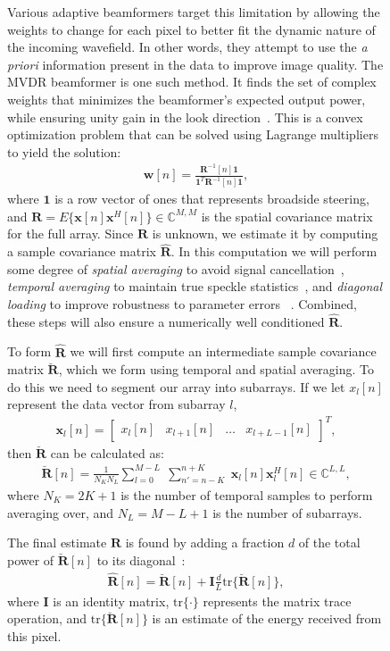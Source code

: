 \documentclass[12pt,journal,draftclsnofoot,onecolumn]{IEEEtran}
\newcommand\bmat[1]{\begin{bmatrix}#1\end{bmatrix}}
\newcommand\tr{\text{tr}}
\newcommand\sumb[2]{\sum\limits_{#1}^{#2}\;}
\newcommand\T{^{\scriptscriptstyle T}}
\renewcommand\H{^{\scriptscriptstyle H}}
\renewcommand\vec[1]{\boldsymbol{#1}}
\newcommand\mat[1]{\boldsymbol{#1}}
\newcommand\1{\vec 1}
\newcommand\I{\mat I}
\newcommand*\x{\vec x}
\newcommand*\R{\mat R}
\newcommand*\Ri{\R^{-1}}
\newcommand*\eR{\mat{\hat R}}
\begin{document}
\begin{figure}[H]
Various adaptive beamformers target this limitation by allowing the weights to change for each pixel to better fit the dynamic nature of the incoming wavefield. In other words, they attempt to use the \emph{a priori} information present in the data to improve image quality. The MVDR beamformer is one such method. It finds the set of complex weights that minimizes the beamformer's expected output power, while ensuring unity gain in the look direction~\cite{Capon1969}. This is a convex optimization problem that can be solved using Lagrange multipliers to yield the solution:
\begin{gather}
\vec w[n] = \frac{\Ri[n]\1}{\1\T\Ri[n]\1},\label{weights}
\end{gather}
where $\1$ is a row vector of ones that represents broadside steering, and $\R=E\{\x[n]\x\H[n]\} \in\mathbb{C}^{M,M}$ is the spatial covariance matrix for the full array. Since $\R$ is unknown, we estimate it by computing a sample covariance matrix $\eR$. In this computation we will perform some degree of \emph{spatial averaging} to avoid signal cancellation~\cite{Kailath1985}, \emph{temporal averaging} to maintain true speckle statistics~\cite{Synnevag2009a}, and \emph{diagonal loading} to improve robustness to parameter errors ~\cite{Cox1987,Maksym1979}. Combined, these steps will also ensure a numerically well conditioned $\eR$.

To form $\eR$ we will first compute an intermediate sample covariance matrix $\breve{\R}$, which we form using temporal and spatial averaging. To do this we need to segment our array into subarrays. If we let $x_l[n]$ represent the data vector from subarray $l$,
\begin{gather}
\x_l[n] = \bmat{x_l[n] & x_{l+1}[n] & \dots & x_{l+L-1}[n]}\T,
\end{gather}
then $\breve{\R}$ can be calculated as:
\begin{gather}
\breve{\R}[n] =  \frac{1}{N_K N_L} \sumb{l=0}{M-L}\sumb{n'=n-K}{n+K} \x_l[n]\x_l\H[n] \in\mathbb{C}^{L,L},\label{spatialR}
\end{gather}
where $N_K = 2K+1$ is the number of temporal samples to perform averaging over, and $N_L = M-L+1$ is the number of subarrays.

The final estimate $\eR$ is found by adding a fraction $d$ of the total power of $\breve{\R}[n]$ to its diagonal~\cite{Synnevag2007}:
\begin{align}
\eR[n] = \breve{\R}[n] + \I \frac{d}{L} \tr\{\breve{\R}[n]\},\label{finalR}
\end{align}
where $\I$ is an identity matrix, $\tr\{\cdot\}$ represents the matrix trace operation, and $\tr\{\breve{\R}[n]\}$ is an estimate of the energy received from this pixel.


\end{figure}
\end{document}
